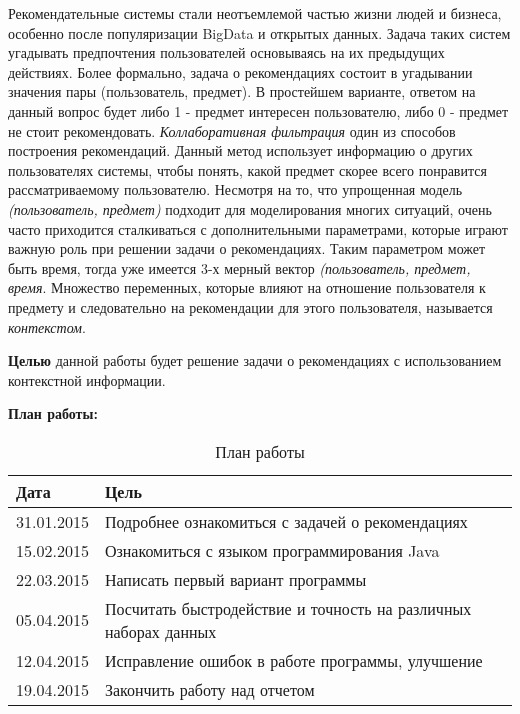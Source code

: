
\setcounter{page}{5}

Рекомендательные системы стали неотъемлемой частью жизни людей и бизнеса, особенно после популяризации BigData и открытых данных. Задача таких систем угадывать предпочтения пользователей основываясь на их предыдущих действиях. Более формально, задача о рекомендациях состоит в угадывании значения пары (пользователь, предмет). В простейшем варианте, ответом на данный вопрос будет либо 1 - предмет интересен пользователю, либо 0 - предмет не стоит рекомендовать. \textit{Коллаборативная фильтрация} один из способов построения рекомендаций. Данный метод использует информацию о других пользователях системы, чтобы понять, какой предмет скорее всего понравится рассматриваемому пользователю. Несмотря на то, что упрощенная модель \textit{(пользователь, предмет)} подходит для моделирования многих ситуаций, очень часто приходится сталкиваться с дополнительными параметрами, которые играют важную роль при решении задачи о рекомендациях. Таким параметром может быть время, тогда уже имеется 3-х мерный вектор \textit{(пользователь, предмет, время}. Множество переменных, которые влияют на отношение пользователя к предмету и следовательно на рекомендации для этого пользователя, называется \textit{контекстом}. 

\textbf{Целью} данной работы будет решение задачи о рекомендациях с использованием контекстной информации.

\clearpage

\textbf{План работы:} 
\begin{table} [htbp]
  \centering
  \parbox{15cm}{\caption{План работы}\label{Ts0Sib}}
  \begin{tabular}{| p{3cm} || p{12cm}l |}
  \hline
  \hline
  Дата & Цель & \\
  \hline
  \hline
  31.01.2015 & Подробнее ознакомиться с задачей о рекомендациях \cite{IgnatovFCA, IgnatovWitology, XavierAmatriain, Alqadah2014} & \\
  \hline
  15.02.2015 & Ознакомиться с языком программирования Java \cite{EckelJava} & \\
  \hline
  22.03.2015 & Написать первый вариант программы & \\
  \hline
  05.04.2015 & Посчитать быстродействие и точность на различных наборах данных & \\
  \hline
  12.04.2015 & Исправление ошибок в работе программы, улучшение & \\
  \hline
  19.04.2015 & Закончить работу над отчетом & \\
  \hline
  \hline
  \end{tabular}
\end{table}

\clearpage